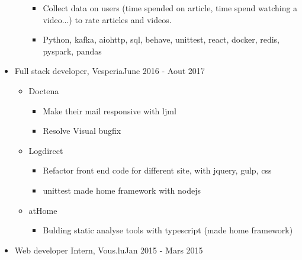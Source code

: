 \documentclass[11pt,letter,sans]{moderncv}
\begin{document}
\begin{itemize}
\begin{itemize}
\begin{itemize}
              \end{itemize}
\begin{itemize}
                \item Collect data on users (time spended on article, time spend watching a video...) to rate articles and videos.
              \end{itemize}
\begin{itemize}
                \item Python, kafka, aiohttp, sql, behave, unittest, react, docker, redis, pyspark, pandas
              \end{itemize}
\end{itemize}
      \item Full stack developer, Vesperia\hfill June 2016 - Aout 2017
      \begin{itemize}
            \item Doctena 
\begin{itemize}
                \item Make their mail responsive with ljml
              \end{itemize}
\begin{itemize}
                \item Resolve Visual bugfix
              \end{itemize}
            \item Logdirect 
\begin{itemize}
                \item Refactor front end code for different site, with jquery, gulp, css
              \end{itemize}
\begin{itemize}
                \item unittest made home framework with nodejs
              \end{itemize}
            \item atHome 
\begin{itemize}
                \item Bulding static analyse tools with typescript (made home framework)
              \end{itemize}
\end{itemize}
      \item Web developer Intern, Vous.lu\hfill Jan 2015 - Mars 2015
      \begin{itemize}
\end{itemize}
  \end{itemize}
\end{document}
